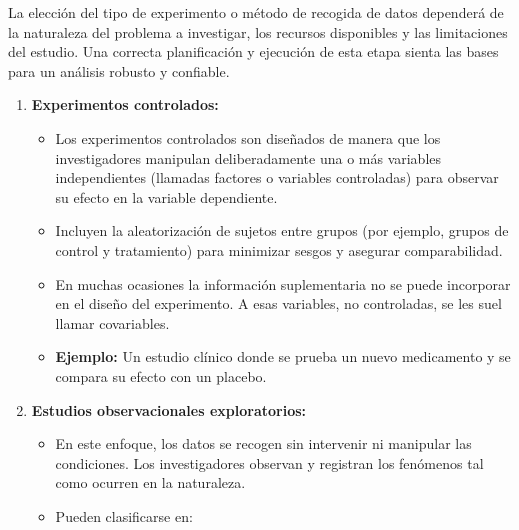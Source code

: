 \documentclass[
  letterpaper,
  DIV=11,
  numbers=noendperiod]{scrreprt}
\providecommand{\tightlist}{%
  \setlength{\itemsep}{0pt}\setlength{\parskip}{0pt}}
\begin{document}
\begin{tcolorbox}[enhanced jigsaw, breakable, toprule=.15mm, bottomtitle=1mm, coltitle=black, colbacktitle=quarto-callout-note-color!10!white, titlerule=0mm, opacitybacktitle=0.6, bottomrule=.15mm, toptitle=1mm, title=\textcolor{quarto-callout-note-color}{\faInfo}\hspace{0.5em}{Tipos de experimentos}, arc=.35mm, rightrule=.15mm, opacityback=0, colframe=quarto-callout-note-color-frame, leftrule=.75mm, left=2mm, colback=white]

La elección del tipo de experimento o método de recogida de datos
dependerá de la naturaleza del problema a investigar, los recursos
disponibles y las limitaciones del estudio. Una correcta planificación y
ejecución de esta etapa sienta las bases para un análisis robusto y
confiable.

\begin{enumerate}
\def\labelenumi{\arabic{enumi}.}
\tightlist
\item
  \textbf{Experimentos controlados:}

  \begin{itemize}
  \tightlist
  \item
    Los experimentos controlados son diseñados de manera que los
    investigadores manipulan deliberadamente una o más variables
    independientes (llamadas factores o variables controladas) para
    observar su efecto en la variable dependiente.
  \item
    Incluyen la aleatorización de sujetos entre grupos (por ejemplo,
    grupos de control y tratamiento) para minimizar sesgos y asegurar
    comparabilidad.
  \item
    En muchas ocasiones la información suplementaria no se puede
    incorporar en el diseño del experimento. A esas variables, no
    controladas, se les suel llamar covariables.
  \item
    \textbf{Ejemplo:} Un estudio clínico donde se prueba un nuevo
    medicamento y se compara su efecto con un placebo.
  \end{itemize}
\item
  \textbf{Estudios observacionales exploratorios:}

  \begin{itemize}
  \tightlist
  \item
    En este enfoque, los datos se recogen sin intervenir ni manipular
    las condiciones. Los investigadores observan y registran los
    fenómenos tal como ocurren en la naturaleza.
  \item
    Pueden clasificarse en:


\end{itemize}
\end{enumerate}
\end{tcolorbox}
\end{document}
